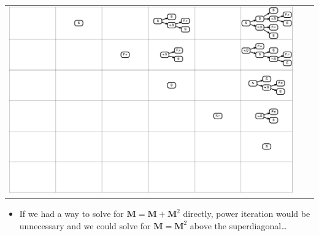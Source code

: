 \documentclass[portrait,a0b,final,a4resizeable]{a0poster}
\def\jointspacing{\vspace{0.3in}}
\begin{document}
\begin{poster}
\begin{multicols}{2}
\begin{minipage}[c]{0.90\columnwidth}
\begin{tabular}{ c c c }
        \includegraphics[trim=420 287 0 0,clip, width=12.34cm]{../figures/parse4.png}
      \end{tabular}
      \begin{itemize}
        \item If we had a way to solve for $\mathbf{M = M + M}^2$ directly, power iteration would be unnecessary and we could solve for $\mathbf{M = M}^2$ above the superdiagonal\ldots
      \end{itemize}
      \end{minipage}
      \jointspacing


\end{multicols}
\end{poster}
\end{document}
